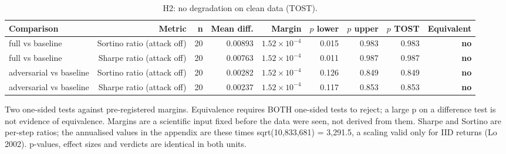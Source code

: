 \begin{table}[htbp]
  \centering
  \caption{H2: no degradation on clean data (TOST).}
  \label{tab:equivalence}
  \begin{tabular}{lrrrrrrrr}
    \toprule
    Comparison & Metric & n & Mean diff. & Margin & $p$ lower & $p$ upper & $p$ TOST & Equivalent \\
    \midrule
    full vs baseline & Sortino ratio (attack off) & 20 & 0.00893 & $1.52\times10^{-4}$ & 0.015 & 0.983 & 0.983 & \textbf{no} \\
    full vs baseline & Sharpe ratio (attack off) & 20 & 0.00763 & $1.52\times10^{-4}$ & 0.011 & 0.987 & 0.987 & \textbf{no} \\
    adversarial vs baseline & Sortino ratio (attack off) & 20 & 0.00282 & $1.52\times10^{-4}$ & 0.126 & 0.849 & 0.849 & \textbf{no} \\
    adversarial vs baseline & Sharpe ratio (attack off) & 20 & 0.00237 & $1.52\times10^{-4}$ & 0.117 & 0.853 & 0.853 & \textbf{no} \\
    \bottomrule
  \end{tabular}
  \begin{minipage}{\linewidth}\vspace{4pt}\footnotesize Two one-sided tests against pre-registered margins. Equivalence requires BOTH one-sided tests to reject; a large p on a difference test is not evidence of equivalence. Margins are a scientific input fixed before the data were seen, not derived from them. Sharpe and Sortino are per-step ratios; the annualised values in the appendix are these times sqrt(10,833,681) = 3,291.5, a scaling valid only for IID returns (Lo 2002). p-values, effect sizes and verdicts are identical in both units.\end{minipage}
\end{table}
